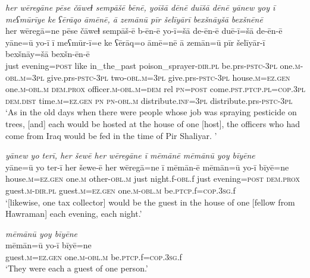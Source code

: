 \ea \label{BP.40}
\textit{her wēregāne pēse čāweɫ sempāšē bēnē, yoīšā dēnē duīšā dēnē yānew yoy ī meʕmūrīye ke ʕērāqo āmēnē, ā zemānū pīr šelīyārī bexšnāyšā bexšnēnē} \\ 
\gll her wēregā=ne pēse čāweɫ sempāš-ē b-ēn-ē yo-ī=šā de-ēn-ē duē-ī=šā de-ēn-ē yāne=ū yo-ī ī meʕmūr-ī=e ke ʕērāq=o āmē=nē ā zemān=ū pīr šelīyār-ī bexšnāy=šā bexšn-ēn-ē \\ 
 just evening\textsc{=\textsc{post}} like in\_the\_past poison\_sprayer\textsc{-dir}\textsc{.pl} be.prs\textsc{-pstc}\textsc{-3pl} one\textsc{.m}\textsc{-obl}\textsc{.m}\textsc{=3pl} give.prs\textsc{-pstc}\textsc{-3pl} two\textsc{-obl}\textsc{.m}\textsc{=3pl} give.prs\textsc{-pstc}\textsc{-3pl} house\textsc{.m}\textsc{=ez.gen} one\textsc{.m}\textsc{-obl}\textsc{.m} \textsc{dem.prox} officer\textsc{.m}\textsc{-obl}\textsc{.m}\textsc{=dem} rel \textsc{pn}\textsc{=\textsc{post}} come\textsc{.pst}\textsc{.ptcp}\textsc{.pl}\textsc{=cop}\textsc{.3pl} \textsc{dem.dist} time\textsc{.m}\textsc{=ez.gen} \textsc{pn} \textsc{pn}\textsc{-obl}\textsc{.m} distribute\textsc{.inf}\textsc{=3pl} distribute.prs\textsc{-pstc}\textsc{-3pl} \\ 
\glt `As in the old days when there were people whose job was spraying pesticide on trees, [and] each would be hosted at the house of one [host], the officers who had come from Iraq would be fed in the time of Pir Shaliyar. '
\z 
 
\ea \label{BP.43}
\textit{yānew yo terī, her šewē her wēregāne ī mēmānē mēmānū yoy bīyēne} \\ 
\gll yāne=ū yo ter-ī her šewe-ē her wēregā=ne ī mēmān-ē mēmān=ū yo-ī bīyē=ne \\ 
 house\textsc{.m}\textsc{=ez.gen} one\textsc{.m} other\textsc{-obl}\textsc{.m} just night.f\textsc{-obl}.f just evening\textsc{=\textsc{post}} \textsc{dem.prox} guest\textsc{.m}\textsc{-dir}\textsc{.pl} guest\textsc{.m}\textsc{=ez.gen} one\textsc{.m}\textsc{-obl}\textsc{.m} be\textsc{.ptcp}.f\textsc{=cop}\textsc{.3sg}.f \\ 
\glt `[likewise, one tax collector] would be the guest in the house of one [fellow from Hawraman]  each evening, each night.'
\z 
 
\ea \label{BP.44}
\textit{mēmānū yoy bīyēne} \\ 
\gll mēmān=ū yo-ī bīyē=ne \\ 
 guest\textsc{.m}\textsc{=ez.gen} one\textsc{.m}\textsc{-obl}\textsc{.m} be\textsc{.ptcp}.f\textsc{=cop}\textsc{.3sg}.f \\ 
\glt `They were each a guest of one person.'
\z 
 
